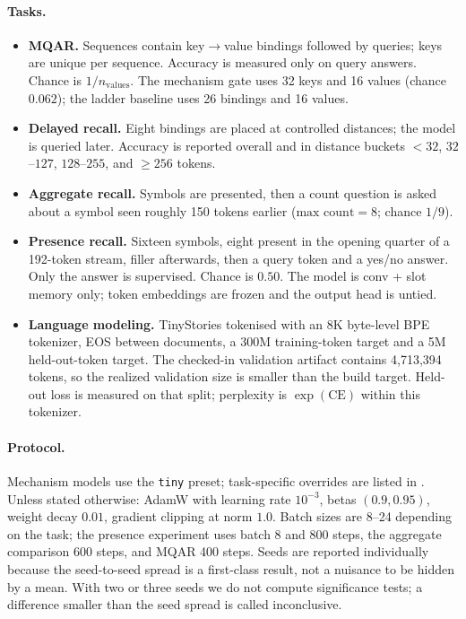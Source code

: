 \paragraph{Tasks.}
\begin{itemize}[leftmargin=1.1em]
\item \textbf{MQAR.} Sequences contain key$\to$value bindings followed by queries; keys are
      unique per sequence. Accuracy is measured only on query answers. Chance is $1/n_{\mathrm{values}}$.
      The mechanism gate uses 32 keys and 16 values (chance $0.062$); the ladder baseline uses
      26 bindings and 16 values.
\item \textbf{Delayed recall.} Eight bindings are placed at controlled distances; the model is
      queried later. Accuracy is reported overall and in distance buckets $<32$, $32$--$127$,
      $128$--$255$, and $\geq256$ tokens.
\item \textbf{Aggregate recall.} Symbols are presented, then a count question is asked about a
      symbol seen roughly 150 tokens earlier ($\text{max count}=8$; chance $1/9$).
\item \textbf{Presence recall.} Sixteen symbols, eight present in the opening quarter of a
      192-token stream, filler afterwards, then a query token and a yes/no answer. Only the
      answer is supervised. Chance is $0.50$. The model is conv + slot memory only; token
      embeddings are frozen and the output head is untied.
\item \textbf{Language modeling.} TinyStories tokenised with an 8K byte-level BPE tokenizer,
      EOS between documents, a 300M training-token target and a 5M held-out-token target. The
      checked-in validation artifact contains 4{,}713{,}394 tokens, so the realized validation
      size is smaller than the build target. Held-out loss is measured on that split; perplexity
      is $\exp(\text{CE})$ within this tokenizer.
\end{itemize}

\paragraph{Protocol.}
Mechanism models use the \texttt{tiny} preset; task-specific overrides are listed in
. Unless stated otherwise: AdamW with learning rate $10^{-3}$, betas
$(0.9,0.95)$, weight decay $0.01$, gradient clipping at norm $1.0$. Batch sizes are 8--24
depending on the task; the presence experiment uses batch 8 and 800 steps, the aggregate
comparison 600 steps, and MQAR 400 steps. Seeds are reported individually because the
seed-to-seed spread is a first-class result, not a nuisance to be hidden by a mean. With two or
three seeds we do not compute significance tests; a difference smaller than the seed spread is
called inconclusive.

